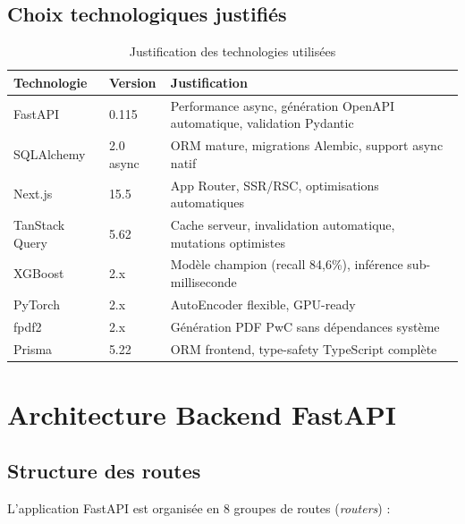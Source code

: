 \documentclass[12pt,a4paper,twoside]{report}
\theoremstyle{definition}
\begin{document}
\subsection{Choix technologiques justifiés}

\begin{table}[H]
\centering
\caption{Justification des technologies utilisées}
\label{tab:tech_choices}
\renewcommand{\arraystretch}{1.3}
\begin{tabular}{p{3.5cm}p{3.5cm}p{5cm}}
\toprule
\textbf{Technologie} & \textbf{Version} & \textbf{Justification} \\
\midrule
FastAPI & 0.115 & Performance async, génération OpenAPI automatique, validation Pydantic \\
SQLAlchemy & 2.0 async & ORM mature, migrations Alembic, support async natif \\
Next.js & 15.5 & App Router, SSR/RSC, optimisations automatiques \\
TanStack Query & 5.62 & Cache serveur, invalidation automatique, mutations optimistes \\
XGBoost & 2.x & Modèle champion (recall 84,6\%), inférence sub-milliseconde \\
PyTorch & 2.x & AutoEncoder flexible, GPU-ready \\
fpdf2 & 2.x & Génération PDF PwC sans dépendances système \\
Prisma & 5.22 & ORM frontend, type-safety TypeScript complète \\
\bottomrule
\end{tabular}
\end{table}

\section{Architecture Backend FastAPI}

\subsection{Structure des routes}

L'application FastAPI est organisée en 8 groupes de routes (\textit{routers}) :
\end{document}
